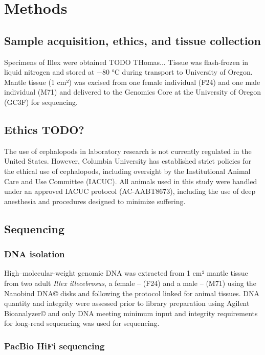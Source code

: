\documentclass[11pt]{article}
\begin{document}
\section{Methods}

\subsection{Sample acquisition, ethics, and tissue collection}

Specimens of Illex were obtained TODO THomas... Tissue was flash-frozen in liquid nitrogen and stored at −80 °C during transport to University of Oregon. Mantle tissue (1 cm²) was excised from one female individual (F24) and one male individual (M71) and delivered to the Genomics Core at the University of Oregon (GC3F) for sequencing.

\subsection{Ethics TODO?}

The use of cephalopods in laboratory research is not currently regulated in the United States. However, Columbia University has established strict policies for the ethical use of cephalopods, including oversight by the Institutional Animal Care and Use Committee (IACUC). All animals used in this study were handled under an approved IACUC protocol (AC-AABT8673), including the use of deep anesthesia and procedures designed to minimize suffering.

\subsection{Sequencing}

\subsubsection{DNA isolation}

High–molecular-weight genomic DNA was extracted from 1 cm² mantle tissue from two adult \textit{Illex illecebrosus}, a female – (F24) and a male – (M71) using the Nanobind DNA© disks and following the protocol linked for animal tissues. DNA quantity and integrity were assessed prior to library preparation using Agilent Bioanalyzer© and only DNA meeting minimum input and integrity requirements for long-read sequencing was used for sequencing.

\subsubsection{PacBio HiFi sequencing}
\end{document}
